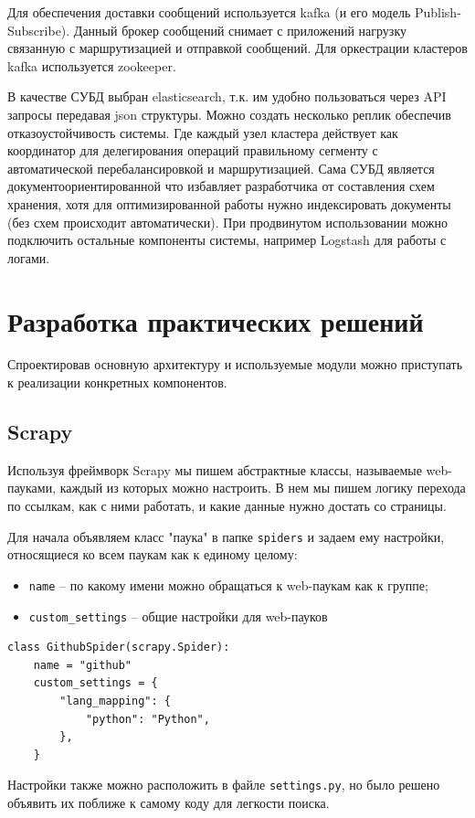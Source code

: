 Для обеспечения доставки сообщений используется kafka (и его модель
Publish-Subscribe). Данный брокер сообщений снимает с приложений нагрузку
связанную с маршрутизацией и отправкой сообщений. Для оркестрации кластеров
kafka используется zookeeper.

В качестве СУБД выбран elasticsearch, т.к. им удобно пользоваться через API
запросы передавая json структуры. Можно создать несколько реплик обеспечив
отказоустойчивость системы. Где каждый узел кластера действует как координатор
для делегирования операций правильному сегменту с автоматической
перебалансировкой и маршрутизацией. Сама СУБД является документоориентированной
что избавляет разработчика от составления схем хранения, хотя для
оптимизированной работы нужно индексировать документы (без схем происходит
автоматически). При продвинутом использовании можно подключить остальные
компоненты системы, например Logstash для работы с логами.

\section{Разработка практических решений}
Спроектировав основную архитектуру и используемые модули можно приступать к
реализации конкретных компонентов.

\subsection{Scrapy}
Используя фреймворк Scrapy мы пишем абстрактные классы, называемые web-пауками,
каждый из которых можно настроить. В нем мы пишем логику перехода по ссылкам,
как с ними работать, и какие данные нужно достать со страницы.

Для начала объявляем класс "паука" в папке \verb|spiders| и задаем ему
настройки, относящиеся ко всем паукам как к единому целому:
\begin{itemize}
    \item \verb|name| -- по какому имени можно обращаться к web-паукам как к группе;
    \item \verb|custom_settings| -- общие настройки для web-пауков
\end{itemize}

\begin{verbatim}
class GithubSpider(scrapy.Spider):
    name = "github"
    custom_settings = {
        "lang_mapping": {
            "python": "Python",
        },
    }
\end{verbatim}

Настройки также можно расположить в файле \verb|settings.py|, но было решено
объявить их поближе к самому коду для легкости поиска.

